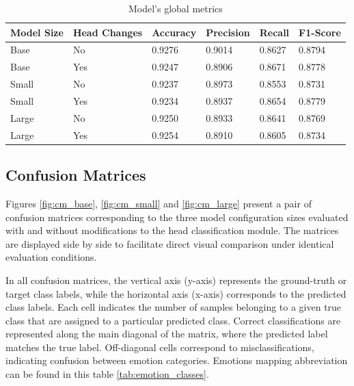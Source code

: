 \begin{table}[H]
\centering
\caption{Model's global metrics}
\label{tab:testing_model_global_metrics}

\begin{tabular}{llllll}
\hline
\textbf{Model Size} & \textbf{Head Changes} & \textbf{Accuracy} & \textbf{Precision} & \textbf{Recall} & \textbf{F1-Score} \\ \hline
Base                & No        & 0.9276            & 0.9014             & 0.8627          & 0.8794            \\
Base                & Yes       & 0.9247            & 0.8906             & 0.8671          & 0.8778            \\
Small               & No        & 0.9237            & 0.8973             & 0.8553          & 0.8731            \\
Small               & Yes       & 0.9234            & 0.8937             & 0.8654          & 0.8779            \\
Large               & No        & 0.9250            & 0.8933             & 0.8641          & 0.8769            \\
Large               & Yes       & 0.9254            & 0.8910             & 0.8605          & 0.8734           
\end{tabular}
\end{table}


\subsection{Confusion Matrices}

Figures \ref{fig:cm_base}, \ref{fig:cm_small} and  \ref{fig:cm_large} present a pair of confusion matrices corresponding to the three model configuration sizes evaluated with and without modifications to the head classification module. The matrices are displayed side by side to facilitate direct visual comparison under identical evaluation conditions. 

In all confusion matrices, the vertical axis (y-axis) represents the ground-truth or target class labels, while the horizontal axis (x-axis) corresponds to the predicted class labels. Each cell indicates the number of samples belonging to a given true class that are assigned to a particular predicted class. Correct classifications are represented along the main diagonal of the matrix, where the predicted label matches the true label. Off-diagonal cells correspond to misclassifications, indicating confusion between emotion categories. Emotions mapping abbreviation can be found in this table \ref{tab:emotion_classes}.


